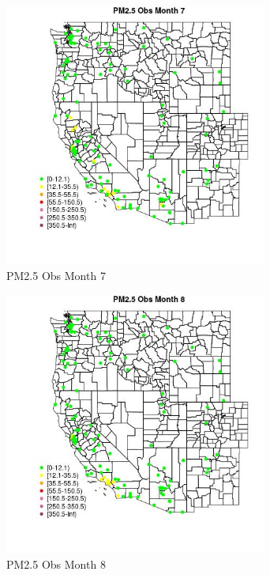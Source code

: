 \begin{figure} 
\centering  
\includegraphics[width=0.77\textwidth]{Code_Outputs/Report_ML_input_PM25_Step4_part_e_de_duplicated_aves_MapObsMo7PM25_Obs.jpg} 
\caption{\label{fig:Report_ML_input_PM25_Step4_part_e_de_duplicated_avesMapObsMo7PM25_Obs}PM2.5 Obs Month 7} 
\end{figure} 
 

\begin{figure} 
\centering  
\includegraphics[width=0.77\textwidth]{Code_Outputs/Report_ML_input_PM25_Step4_part_e_de_duplicated_aves_MapObsMo8PM25_Obs.jpg} 
\caption{\label{fig:Report_ML_input_PM25_Step4_part_e_de_duplicated_avesMapObsMo8PM25_Obs}PM2.5 Obs Month 8} 
\end{figure} 
 

